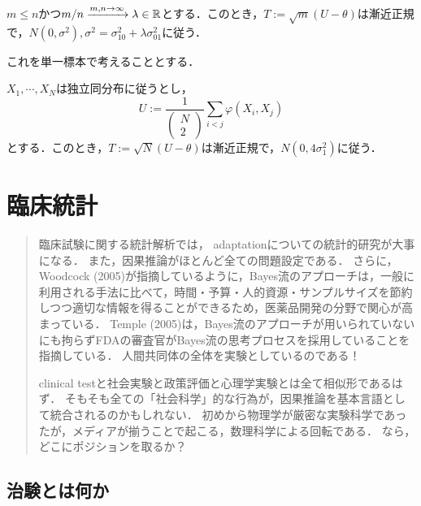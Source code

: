 \documentclass[uplatex,dvipdfmx]{jsreport}
\begin{document}
\begin{theorem}
    $m\le n$かつ$m/n\xrightarrow{m,n\to\infty}\lambda\in\mathbb{R}$とする．このとき，$T:=\sqrt{m}(U-\theta)$は漸近正規で，$N(0,\sigma^2),\sigma^2=\sigma_{10}^2+\lambda\sigma_{01}^2$に従う．
\end{theorem}

これを単一標本で考えることとする．

\begin{theorem}
    $X_1,\cdots,X_N$は独立同分布に従うとし，
    \[U:=\frac{1}{\begin{pmatrix}N\\2\end{pmatrix}}\sum_{i<j}\varphi(X_i,X_j)\]
    とする．このとき，$T:=\sqrt{N}(U-\theta)$は漸近正規で，$N(0,4\sigma_1^2)$に従う．
\end{theorem}



\chapter{臨床統計}

\begin{quotation}
    臨床試験に関する統計解析では，
    adaptationについての統計的研究が大事になる．
    また，因果推論がほとんど全ての問題設定である．
    さらに，Woodcock (2005)が指摘しているように，Bayes流のアプローチは，一般に利用される手法に比べて，時間・予算・人的資源・サンプルサイズを節約しつつ適切な情報を得ることができるため，医薬品開発の分野で関心が高まっている．
    Temple (2005)は，Bayes流のアプローチが用いられていないにも拘らずFDAの審査官がBayes流の思考プロセスを採用していることを指摘している．
    人間共同体の全体を実験としているのである！

    clinical testと社会実験と政策評価と心理学実験とは全て相似形であるはず．
    そもそも全ての「社会科学」的な行為が，因果推論を基本言語として統合されるのかもしれない．
    初めから物理学が厳密な実験科学であったが，メディアが揃うことで起こる，数理科学による回転である．
    なら，どこにポジションを取るか？
\end{quotation}

\section{治験とは何か}
\end{document}
